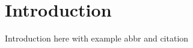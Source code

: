 \chapter{Introduction}
\label{chap:introduction}

Introduction here with example \gls{abbr} and citation~\cite{Ran12}
